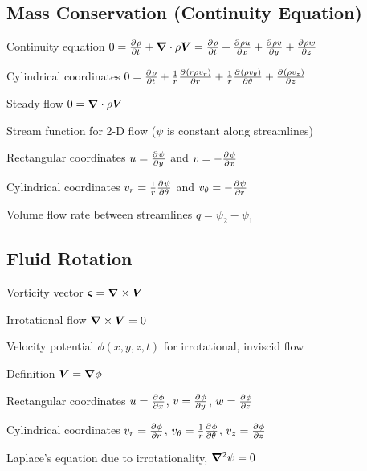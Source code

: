 \documentclass{article}
\begin{document}
\subsection{Mass Conservation (Continuity Equation)}
\begin{description*}
\item[Continuity equation]
  \(0 = \pd{\rho}{t} + \del\cdot\rho\vec{V}
  = \pd{\rho}{t}+\pd{\rho u}{x}+\pd{\rho v}{y}+\pd{\rho w}{z}\)
\item[Cylindrical coordinates]
  \(0 = \pd{\rho}{t} + \frac{1}{r}\pd{(r\rho v_r)}{r}
  + \frac{1}{r}\pd{(\rho v_\theta)}{\theta} + \pd{(\rho v_z)}{z}\)
\item[Steady flow]
  \(0 = \bm{\nabla}\cdot\rho\bm{V}\)
\item[Stream function for 2-D flow ($\psi$ is constant along streamlines)]~
  \begin{description*}
  \item[Rectangular coordinates]
    \(u = \pd{\psi}{y}\) and \(v = -\pd{\psi}{x}\)
  \item[Cylindrical coordinates]
    \(v_r = \frac{1}{r}\pd{\psi}{\theta}\) and \(v_\theta = -\pd{\psi}{r}\)
  \item[Volume flow rate between streamlines]
    \(q = \psi_2 - \psi_1\)
  \end{description*}
\end{description*}

\subsection{Fluid Rotation}
\begin{description*}
\item[Vorticity vector]
  \(\bm{\varsigma} = \bm{\nabla}\times\bm{V}\)
\item[Irrotational flow]
  \(\bm{\nabla}\times\bm{V} = 0\)
\item[Velocity potential $\phi(x,y,z,t)$] for irrotational, inviscid flow
  \begin{description*}
  \item[Definition]
    \(\bm{V} = \bm{\nabla}\phi\)
  \item[Rectangular coordinates]
    \(u = \pd{\phi}{x}\),
    \(v = \pd{\phi}{y}\),
    \(w = \pd{\phi}{z}\)
  \item[Cylindrical coordinates]
    \(v_r = \pd{\phi}{r}\),
    \(v_\theta = \frac{1}{r}\pd{\phi}{\theta}\),
    \(v_z = \pd{\phi}{z}\)
  \item[Laplace's equation] due to irrotationality,
    \(\bm{\nabla}^2\psi = 0\)
  \end{description*}
\end{description*}
\end{document}
